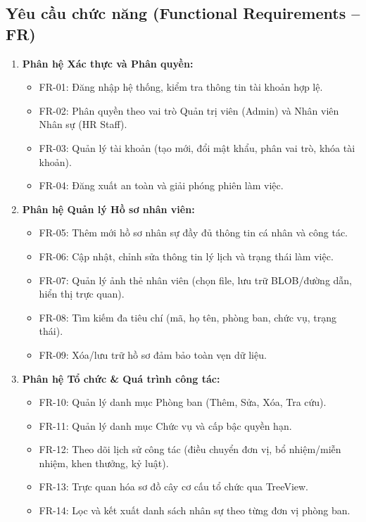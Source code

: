 \documentclass[12pt,a4paper]{report}
\begin{document}
\subsection{Yêu cầu chức năng (Functional Requirements -- FR)}
\begin{enumerate}[leftmargin=1.0cm]
    \item \textbf{Phân hệ Xác thực và Phân quyền:}
    \begin{itemize}
        \item FR-01: Đăng nhập hệ thống, kiểm tra thông tin tài khoản hợp lệ.
        \item FR-02: Phân quyền theo vai trò Quản trị viên (Admin) và Nhân viên Nhân sự (HR Staff).
        \item FR-03: Quản lý tài khoản (tạo mới, đổi mật khẩu, phân vai trò, khóa tài khoản).
        \item FR-04: Đăng xuất an toàn và giải phóng phiên làm việc.
    \end{itemize}
    \item \textbf{Phân hệ Quản lý Hồ sơ nhân viên:}
    \begin{itemize}
        \item FR-05: Thêm mới hồ sơ nhân sự đầy đủ thông tin cá nhân và công tác.
        \item FR-06: Cập nhật, chỉnh sửa thông tin lý lịch và trạng thái làm việc.
        \item FR-07: Quản lý ảnh thẻ nhân viên (chọn file, lưu trữ BLOB/đường dẫn, hiển thị trực quan).
        \item FR-08: Tìm kiếm đa tiêu chí (mã, họ tên, phòng ban, chức vụ, trạng thái).
        \item FR-09: Xóa/lưu trữ hồ sơ đảm bảo toàn vẹn dữ liệu.
    \end{itemize}
    \item \textbf{Phân hệ Tổ chức \& Quá trình công tác:}
    \begin{itemize}
        \item FR-10: Quản lý danh mục Phòng ban (Thêm, Sửa, Xóa, Tra cứu).
        \item FR-11: Quản lý danh mục Chức vụ và cấp bậc quyền hạn.
        \item FR-12: Theo dõi lịch sử công tác (điều chuyển đơn vị, bổ nhiệm/miễn nhiệm, khen thưởng, kỷ luật).
        \item FR-13: Trực quan hóa sơ đồ cây cơ cấu tổ chức qua TreeView.
        \item FR-14: Lọc và kết xuất danh sách nhân sự theo từng đơn vị phòng ban.

\end{itemize}
\end{enumerate}
\end{document}
